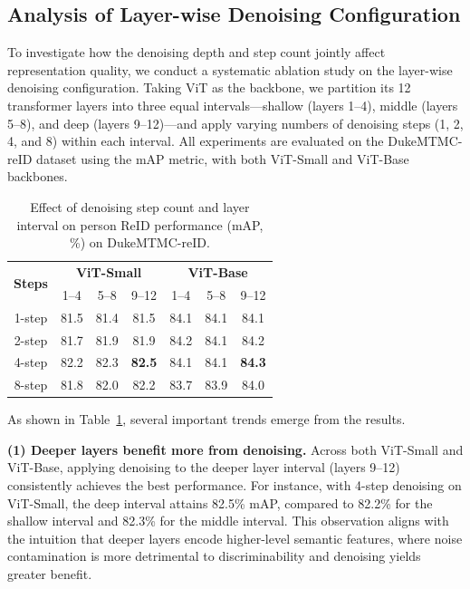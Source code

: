 \documentclass[conference]{IEEEtran}
\begin{document}
{{\color{red}
\subsection{Analysis of Layer-wise Denoising Configuration}
\label{sec:layer_wise_denoising}

To investigate how the denoising depth and step count jointly affect representation quality, we conduct a systematic ablation study on the layer-wise denoising configuration. Taking ViT as the backbone, we partition its 12 transformer layers into three equal intervals—shallow (layers 1–4), middle (layers 5–8), and deep (layers 9–12)—and apply varying numbers of denoising steps (1, 2, 4, and 8) within each interval. All experiments are evaluated on the DukeMTMC-reID dataset using the mAP metric, with both ViT-Small and ViT-Base backbones.

\begin{table}[t]
\centering
\caption{Effect of denoising step count and layer interval on person ReID performance (mAP, \%) on DukeMTMC-reID.}
\label{tab:layer_wise_denoising}
\vspace{0.2cm}
\renewcommand{\arraystretch}{1.2}
\begin{tabular}{c|ccc|ccc}
\hline \hline
\multirow{2}{*}{\textbf{Steps}} & \multicolumn{3}{c|}{\textbf{ViT-Small}} & \multicolumn{3}{c}{\textbf{ViT-Base}} \\
 & 1--4 & 5--8 & 9--12 & 1--4 & 5--8 & 9--12 \\
\hline
1-step & 81.5 & 81.4 & 81.5 & 84.1 & 84.1 & 84.1 \\
2-step & 81.7 & 81.9 & 81.9 & 84.2 & 84.1 & 84.2 \\
4-step & 82.2 & 82.3 & \textbf{82.5} & 84.1 & 84.1 & \textbf{84.3} \\
8-step & 81.8 & 82.0 & 82.2 & 83.7 & 83.9 & 84.0 \\
\hline \hline
\end{tabular}
\end{table}

As shown in Table~\ref{tab:layer_wise_denoising}, several important trends emerge from the results.

\textbf{(1) Deeper layers benefit more from denoising.} Across both ViT-Small and ViT-Base, applying denoising to the deeper layer interval (layers 9–12) consistently achieves the best performance. For instance, with 4-step denoising on ViT-Small, the deep interval attains 82.5\% mAP, compared to 82.2\% for the shallow interval and 82.3\% for the middle interval. This observation aligns with the intuition that deeper layers encode higher-level semantic features, where noise contamination is more detrimental to discriminability and denoising yields greater benefit.

}}
\end{document}
